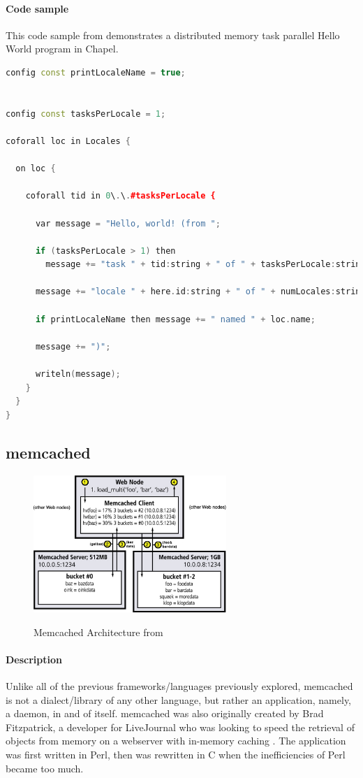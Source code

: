 	\paragraph{Code sample}
	This code sample from \cite{chapel_github} demonstrates a distributed memory task parallel Hello World program in Chapel.
		
	\begin{lstlisting}[language=C++, caption=Hello World in Chapel, captionpos=b]
config const printLocaleName = true;


config const tasksPerLocale = 1;

coforall loc in Locales {

  on loc {

    coforall tid in 0\.\.#tasksPerLocale {

      var message = "Hello, world! (from ";

      if (tasksPerLocale > 1) then
        message += "task " + tid:string + " of " + tasksPerLocale:string + " on ";

      message += "locale " + here.id:string + " of " + numLocales:string;

      if printLocaleName then message += " named " + loc.name;

      message += ")";

      writeln(message);
    }
  }
}
	\end{lstlisting}

\subsection{memcached}
    \begin{figure}[h]
		\centering
		\includegraphics[width=0.65\textwidth]{Figures/memcached_arch.jpg}
		\label{fig:memcached_arch}
		\caption{Memcached Architecture from \cite{memcached_linux}}
    \end{figure}
	\paragraph{Description}
	Unlike all of the previous frameworks/languages previously explored, memcached is not a dialect/library of any other language, but rather an application, namely, a daemon, in and of itself. memcached was also originally created by Brad Fitzpatrick, a developer for LiveJournal who was looking to speed the retrieval of objects from memory on a webserver with in-memory caching \cite{lj_dev}. The application was first written in Perl, then was rewritten in C when the inefficiencies of Perl became too much.

